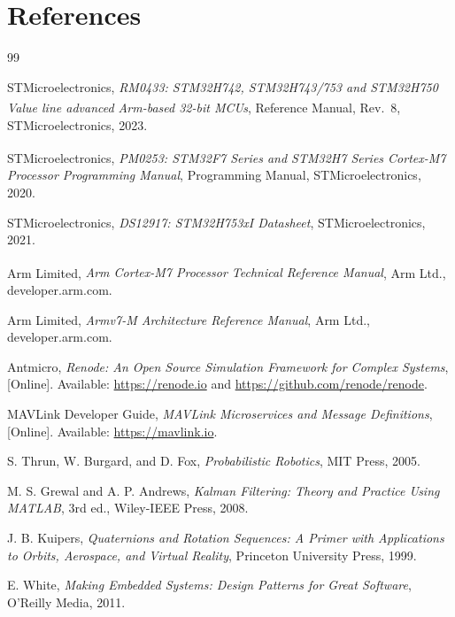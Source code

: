 \cleardoublepage
{}
{}
\chapter*{References}

\begin{thebibliography}{99}

STMicroelectronics, \emph{RM0433: STM32H742, STM32H743/753 and STM32H750 Value line advanced Arm\textsuperscript{\textregistered}-based 32-bit MCUs}, Reference Manual, Rev.\ 8, STMicroelectronics, 2023.

STMicroelectronics, \emph{PM0253: STM32F7 Series and STM32H7 Series Cortex\textsuperscript{\textregistered}-M7 Processor Programming Manual}, Programming Manual, STMicroelectronics, 2020.

STMicroelectronics, \emph{DS12917: STM32H753xI Datasheet}, STMicroelectronics, 2021.

Arm Limited, \emph{Arm\textsuperscript{\textregistered} Cortex\textsuperscript{\textregistered}-M7 Processor Technical Reference Manual}, Arm Ltd., developer.arm.com.

Arm Limited, \emph{Armv7-M Architecture Reference Manual}, Arm Ltd., developer.arm.com.

Antmicro, \emph{Renode: An Open Source Simulation Framework for Complex Systems}, [Online]. Available: \url{https://renode.io} and \url{https://github.com/renode/renode}.

MAVLink Developer Guide, \emph{MAVLink Microservices and Message Definitions}, [Online]. Available: \url{https://mavlink.io}.

S. Thrun, W. Burgard, and D. Fox, \emph{Probabilistic Robotics}, MIT Press, 2005.

M. S. Grewal and A. P. Andrews, \emph{Kalman Filtering: Theory and Practice Using MATLAB}, 3rd ed., Wiley-IEEE Press, 2008.

J. B. Kuipers, \emph{Quaternions and Rotation Sequences: A Primer with Applications to Orbits, Aerospace, and Virtual Reality}, Princeton University Press, 1999.

E. White, \emph{Making Embedded Systems: Design Patterns for Great Software}, O'Reilly Media, 2011.


\end{thebibliography}
